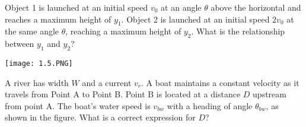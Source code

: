 \documentclass[../mech.tex]{subfiles}
\begin{document}
\ex Object 1 is launched at an initial speed $v_0$ at an angle $\theta$ above the horizontal and reaches a maximum height of $y_1$. Object 2 is launched at an initial speed $2v_0$ at the same angle $\theta$, reaching a maximum height of $y_2$. What is the relationship between $y_1$ and $y_2$?

\pagebreak
\ex \begin{center}
    \texttt{[image: 1.5.PNG]}
\end{center}
A river has width $W$ and a current $v_r$. A boat maintains a constant velocity as it travels from Point A to Point B. Point B is located at a distance $D$ upstream from point A. The boat's water speed is 
$v_{bw}$ with a heading of angle $\theta_{bw}$, as shown in the figure. What is a correct expression for $D$?
\end{document}
